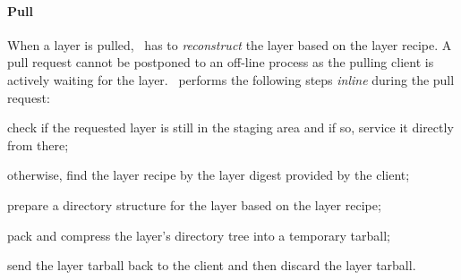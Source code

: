 \paragraph{Pull}
%
When a layer is pulled, \sysname\ has to \emph{reconstruct} the layer based
on the layer recipe.
%
A pull request cannot be postponed to an off-line process as the
pulling client is actively waiting for the layer.
%
\sysname\ performs the following steps \emph{inline} during the pull request:
%
\begin{compactenumerate}
  \item check if the requested layer is still in the staging area and if so,
	service it directly from there;
  \item otherwise, find the layer recipe by the layer digest
	provided by the client;
  \item prepare a directory structure for the layer based on the layer recipe;
  \item pack and compress the layer's directory tree into a temporary tarball;
  \item send the layer tarball back to the client and then discard the layer tarball.
\end{compactenumerate}
